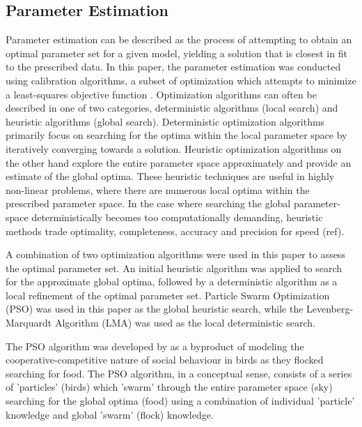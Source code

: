 \subsection{Parameter Estimation}
Parameter estimation can be described as the process of attempting to obtain an optimal parameter set for a given model, yielding a solution that is closest in fit to the prescribed data. In this paper, the parameter estimation was conducted using calibration algorithms, a subset of optimization which attempts to minimize a least-squares objective function \cite{matott_ostrich:_2008}. Optimization algorithms can often be described in one of two categories, deterministic algorithms (local search) and heuristic algorithms (global search). Deterministic optimization algorithms primarily focus on searching for the optima within the local parameter space by iteratively converging towards a solution. Heuristic optimization algorithms on the other hand explore the entire parameter space approximately and provide an estimate of the global optima. These heuristic techniques are useful in highly non-linear problems, where there are numerous local optima within the prescribed parameter space. In the case where searching the global parameter-space deterministically becomes too computationally demanding, heuristic methods trade optimality, completeness, accuracy and precision for speed (ref). 

A combination of two optimization algorithms were used in this paper to assess the optimal parameter set. An initial heuristic algorithm was applied to search for the approximate global optima, followed by a deterministic algorithm as a local refinement of the optimal parameter set. Particle Swarm Optimization (PSO) was used in this paper as the global heuristic search, while the Levenberg-Marquardt Algorithm (LMA) was used as the local deterministic search. 

The PSO algorithm was developed by \citet{Kennedy} as a byproduct of modeling the cooperative-competitive nature of social behaviour in birds as they flocked searching for food. The PSO algorithm, in a conceptual sense, consists of a series of 'particles' (birds) which 'swarm' through the entire parameter space (sky) searching for the global optima (food) using a combination of individual 'particle' knowledge and global 'swarm' (flock) knowledge.

